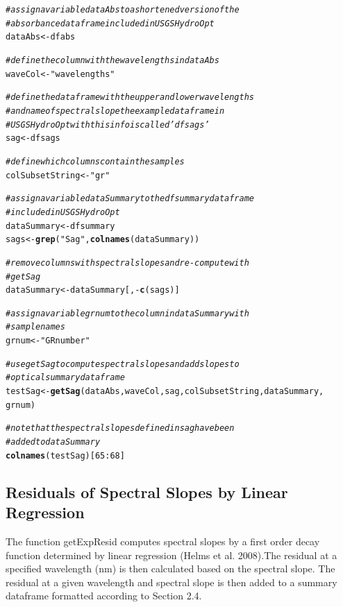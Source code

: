 \documentclass[a4paper,11pt]{article}\usepackage[]{graphicx}\usepackage[]{color}
\makeatletter
\newcommand{\hlnum}[1]{\textcolor[rgb]{0.686,0.059,0.569}{#1}}%
\newcommand{\hlstr}[1]{\textcolor[rgb]{0.192,0.494,0.8}{#1}}%
\newcommand{\hlcom}[1]{\textcolor[rgb]{0.678,0.584,0.686}{\textit{#1}}}%
\newcommand{\hlopt}[1]{\textcolor[rgb]{0,0,0}{#1}}%
\newcommand{\hlstd}[1]{\textcolor[rgb]{0.345,0.345,0.345}{#1}}%
\newcommand{\hlkwb}[1]{\textcolor[rgb]{0.69,0.353,0.396}{#1}}%
\newcommand{\hlkwd}[1]{\textcolor[rgb]{0.737,0.353,0.396}{\textbf{#1}}}%
\newenvironment{kframe}{%
 \def\at@end@of@kframe{}%
 \ifinner\ifhmode%
  \def\at@end@of@kframe{\end{minipage}}%
  \begin{minipage}{\columnwidth}%
 \fi\fi%
 \def\FrameCommand##1{\hskip\@totalleftmargin \hskip-\fboxsep
 \colorbox{shadecolor}{##1}\hskip-\fboxsep
     \hskip-\linewidth \hskip-\@totalleftmargin \hskip\columnwidth}%
 \MakeFramed {\advance\hsize-\width
   \@totalleftmargin\z@ \linewidth\hsize
   \@setminipage}}%
 {\par\unskip\endMakeFramed%
 \at@end@of@kframe}
\newenvironment{knitrout}{}{} %
\makeatother
\begin{document}
\begin{knitrout}
\color{fgcolor}\begin{kframe}
\begin{alltt}
\hlcom{# assign a variable dataAbs to a shortened version of the}
\hlcom{# absorbance dataframe included in USGSHydroOpt}
\hlstd{dataAbs} \hlkwb{<-} \hlstd{dfabs}

\hlcom{# define the column with the wavelengths in dataAbs}
\hlstd{waveCol} \hlkwb{<-} \hlstr{"wavelengths"}

\hlcom{# define the dataframe with the upper and lower wavelengths}
\hlcom{# and name of spectral slope the example dataframe in}
\hlcom{# USGSHydroOpt with this info is called 'dfsags'}
\hlstd{sag} \hlkwb{<-} \hlstd{dfsags}

\hlcom{# define which columns contain the samples}
\hlstd{colSubsetString} \hlkwb{<-} \hlstr{"gr"}

\hlcom{# assign a variable dataSummary to the dfsummary dataframe}
\hlcom{# included in USGSHydroOpt}
\hlstd{dataSummary} \hlkwb{<-} \hlstd{dfsummary}
\hlstd{sags} \hlkwb{<-} \hlkwd{grep}\hlstd{(}\hlstr{"Sag"}\hlstd{,} \hlkwd{colnames}\hlstd{(dataSummary))}

\hlcom{# remove columns with spectral slopes and re-compute with}
\hlcom{# getSag}
\hlstd{dataSummary} \hlkwb{<-} \hlstd{dataSummary[,} \hlopt{-}\hlkwd{c}\hlstd{(sags)]}

\hlcom{# assign a variable grnum to the column in dataSummary with}
\hlcom{# sample names}
\hlstd{grnum} \hlkwb{<-} \hlstr{"GRnumber"}

\hlcom{# use getSag to compute spectral slopes and add slopes to}
\hlcom{# optical summary dataframe}
\hlstd{testSag} \hlkwb{<-} \hlkwd{getSag}\hlstd{(dataAbs, waveCol, sag, colSubsetString, dataSummary,}
    \hlstd{grnum)}

\hlcom{# note that the spectral slopes defined in sag have been}
\hlcom{# added to dataSummary}
\hlkwd{colnames}\hlstd{(testSag)[}\hlnum{65}\hlopt{:}\hlnum{68}\hlstd{]}
\end{alltt}
\end{kframe}
\end{knitrout}

\subsection{Residuals of Spectral Slopes by Linear Regression}
The function getExpResid computes spectral slopes by a first order decay function determined by linear regression (Helms et al. 2008).The residual at a specified wavelength (nm) is then calculated based on the spectral slope. The residual at a given wavelength and spectral slope is then added to a summary dataframe formatted according to Section 2.4. 
\end{document}
